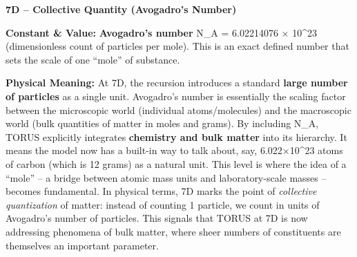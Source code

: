 \documentclass[
]{article}
\begin{document}
\textbf{7D -- Collective Quantity (Avogadro's Number)}

\textbf{Constant \& Value:} \textbf{Avogadro's number} N\_A = 6.02214076
× 10\^{}23 (dimensionless count of particles per mole)\hspace{0pt}. This
is an exact defined number that sets the scale of one ``mole'' of
substance.

\textbf{Physical Meaning:} At 7D, the recursion introduces a standard
\textbf{large number of particles} as a single unit. Avogadro's number
is essentially the scaling factor between the microscopic world
(individual atoms/molecules) and the macroscopic world (bulk quantities
of matter in moles and grams)\hspace{0pt}. By including N\_A, TORUS
explicitly integrates \textbf{chemistry and bulk matter} into its
hierarchy. It means the model now has a built-in way to talk about, say,
6.022×10\^{}23 atoms of carbon (which is 12 grams) as a natural unit.
This level is where the idea of a ``mole'' -- a bridge between atomic
mass units and laboratory-scale masses -- becomes fundamental. In
physical terms, 7D marks the point of \emph{collective quantization} of
matter: instead of counting 1 particle, we count in units of Avogadro's
number of particles. This signals that TORUS at 7D is now addressing
phenomena of bulk matter, where sheer numbers of constituents are
themselves an important parameter.
\end{document}
